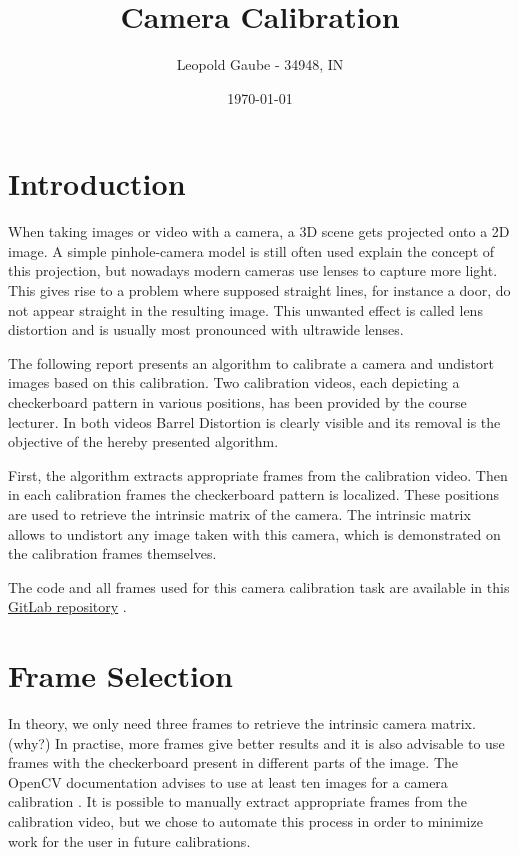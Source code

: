 \documentclass[bibliography=totoc]{scrartcl}
\title{Camera Calibration}
\author{Leopold Gaube - 34948, IN}
\date{\today}
\begin{document}
\maketitle
\tableofcontents

\clearpage

\section{Introduction}

When taking images or video with a camera, a 3D scene gets projected onto a 2D image.
A simple pinhole-camera model is still often used explain the concept of this projection, but nowadays modern cameras use lenses to capture more light.
This gives rise to a problem where supposed straight lines, for instance a door, do not appear straight in the resulting image. 
This unwanted effect is called lens distortion and is usually most pronounced with ultrawide lenses.

The following report presents an algorithm to calibrate a camera and undistort images based on this calibration.
Two calibration videos, each depicting a checkerboard pattern in various positions, has been provided by the course lecturer.
In both videos Barrel Distortion is clearly visible and its removal is the objective of the hereby presented algorithm.

First, the algorithm extracts appropriate frames from the calibration video.
Then in each calibration frames the checkerboard pattern is localized.
These positions are used to retrieve the intrinsic matrix of the camera. 
The intrinsic matrix allows to undistort any image taken with this camera, which is demonstrated on the calibration frames themselves.

The code and all frames used for this camera calibration task are available in this \href{https://gitlab.com/gaubeleo/camera-calibration}{GitLab repository} \cite{Gitlab}.

\section{Frame Selection}
In theory, we only need three frames to retrieve the intrinsic camera matrix. (why?)
In practise, more frames give better results and it is also advisable to use frames with the checkerboard present in different parts of the image.
The OpenCV documentation advises to use at least ten images for a camera calibration \cite{CameraCalibration}.
It is possible to manually extract appropriate frames from the calibration video, but we chose to automate this process in order to minimize work for the user in future calibrations. 
\end{document}
